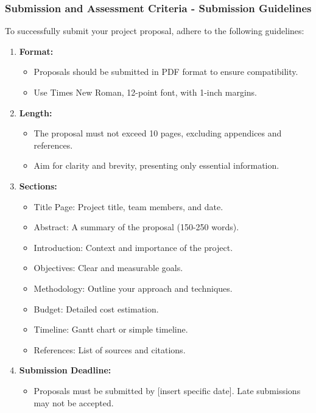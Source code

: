 \documentclass[aspectratio=169]{beamer}
\begin{document}
\begin{frame}[fragile]
\frametitle{Submission and Assessment Criteria - Submission Guidelines}
To successfully submit your project proposal, adhere to the following guidelines:

\begin{enumerate}
    \item \textbf{Format:}
    \begin{itemize}
        \item Proposals should be submitted in PDF format to ensure compatibility.
        \item Use Times New Roman, 12-point font, with 1-inch margins.
    \end{itemize}

    \item \textbf{Length:}
    \begin{itemize}
        \item The proposal must not exceed 10 pages, excluding appendices and references.
        \item Aim for clarity and brevity, presenting only essential information.
    \end{itemize}

    \item \textbf{Sections:}
    \begin{itemize}
        \item Title Page: Project title, team members, and date.
        \item Abstract: A summary of the proposal (150-250 words).
        \item Introduction: Context and importance of the project.
        \item Objectives: Clear and measurable goals.
        \item Methodology: Outline your approach and techniques.
        \item Budget: Detailed cost estimation.
        \item Timeline: Gantt chart or simple timeline.
        \item References: List of sources and citations.
    \end{itemize}

    \item \textbf{Submission Deadline:}
    \begin{itemize}
        \item Proposals must be submitted by [insert specific date]. Late submissions may not be accepted.
    \end{itemize}
\end{enumerate}
\end{frame}
\end{document}
